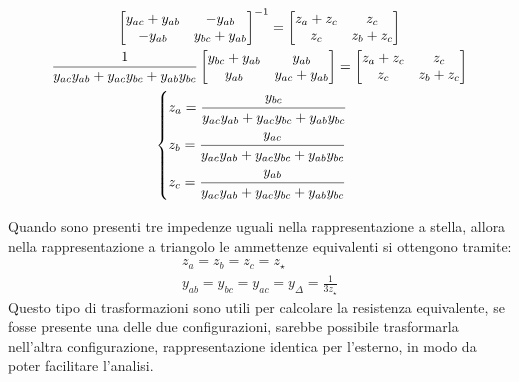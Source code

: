 \documentclass{article}
\numberwithin{equation}{subsection}
\begin{document}
\begin{gather*}
    \begin{bmatrix}
        y_{ac}+y_{ab}&-y_{ab}\\-y_{ab}&y_{bc}+y_{ab}
    \end{bmatrix}^{-1}=\begin{bmatrix}
        z_a+z_c&z_c\\z_c&z_b+z_c
    \end{bmatrix}\\
    \displaystyle\frac{1}{y_{ac}y_{ab}+y_{ac}y_{bc}+y_{ab}y_{bc}}\begin{bmatrix}
        y_{bc}+y_{ab}&y_{ab}\\y_{ab}&y_{ac}+y_{ab}
    \end{bmatrix}=\begin{bmatrix}
        z_a+z_c&z_c\\z_c&z_b+z_c
    \end{bmatrix}\\
    \begin{cases}
        z_a=\displaystyle\frac{\strut y_{bc}}{\strut y_{ac}y_{ab}+y_{ac}y_{bc}+y_{ab}y_{bc}}\\
        z_b=\displaystyle\frac{\strut y_{ac}}{\strut y_{ac}y_{ab}+y_{ac}y_{bc}+y_{ab}y_{bc}}\\
        z_c=\displaystyle\frac{\strut y_{ab}}{\strut y_{ac}y_{ab}+y_{ac}y_{bc}+y_{ab}y_{bc}}
    \end{cases}
\end{gather*}


Quando sono presenti tre impedenze uguali nella rappresentazione a stella, allora nella rappresentazione a triangolo le ammettenze equivalenti si ottengono tramite:
\begin{gather*}
    z_a=z_b=z_c=z_{\star}\\
    y_{ab}=y_{bc}=y_{ac}=y_{\Delta}=\displaystyle\frac{1}{3z_{\star}}
\end{gather*}
Questo tipo di trasformazioni sono utili per calcolare la resistenza equivalente, se fosse presente una delle due configurazioni, sarebbe possibile trasformarla 
nell'altra configurazione, rappresentazione identica per l'esterno, in modo da poter facilitare l'analisi. 


\end{document}

